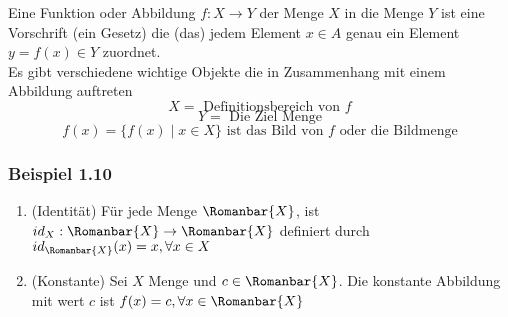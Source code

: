 \begin{definition}{1.9}
Eine Funktion oder Abbildung $f:X\rightarrow Y$ der Menge $X$ in die Menge $Y$ ist eine Vorschrift (ein Gesetz) die (das) jedem Element $x\in A$ genau ein Element $y=f(x)\in Y$ zuordnet. \\

Es gibt verschiedene wichtige Objekte die in Zusammenhang mit einem Abbildung auftreten 
\[X= \text{ Definitionsbereich von } f\]
\[Y= \text{ Die Ziel Menge}\]
\[f(x)=\{f(x)\mid x\in X\}\text{ ist das Bild von }f\text{ oder die Bildmenge}\]
\end{definition}

\subsubsection*{Beispiel 1.10}
\begin{enumerate}
\item (Identität) Für jede Menge $\Romanbar{X}$, ist $id_X : \Romanbar{X} \rightarrow\Romanbar{X}$ definiert durch $id_{\Romanbar{X}}(x)=x, \forall x\in X$ 

\begin{center}
\end{center}



\item (Konstante) Sei $X$ Menge und $c\in \Romanbar{X}$. Die konstante Abbildung mit wert $c$ ist $f(x)=c, \forall x \in \Romanbar{X}$  

\begin{center}
\end{center}
\end{enumerate}
